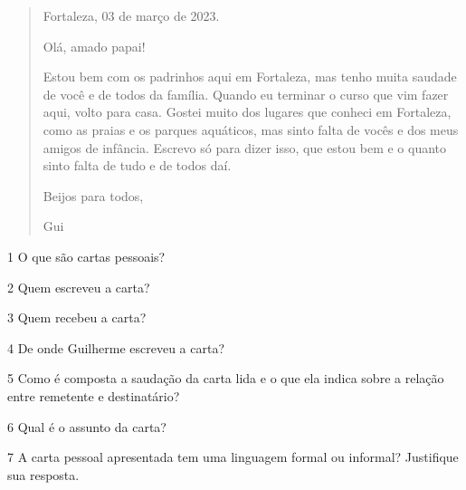 \begin{quote}
\begin{flushright}
Fortaleza, 03 de março de 2023.
\end{flushright}

Olá, amado papai!

Estou bem com os padrinhos aqui em Fortaleza, mas tenho muita saudade de
você e de todos da família. Quando eu terminar o curso que vim fazer
aqui, volto para casa. Gostei muito dos lugares que conheci em
Fortaleza, como as praias e os parques aquáticos, mas sinto falta de
vocês e dos meus amigos de infância. Escrevo só para dizer isso, que
estou bem e o quanto sinto falta de tudo e de todos daí.

\begin{flushright}
Beijos para todos,

Gui
\end{flushright}
\end{quote}


\num{1} O que são cartas pessoais?


\num{2} Quem escreveu a carta?


\num{3} Quem recebeu a carta?


\num{4} De onde Guilherme escreveu a carta?


\num{5} Como é composta a saudação da carta lida e o que ela indica sobre a
relação entre remetente e destinatário?


\num{6} Qual é o assunto da carta?


\num{7} A carta pessoal apresentada tem uma linguagem formal ou informal?
Justifique sua resposta.

